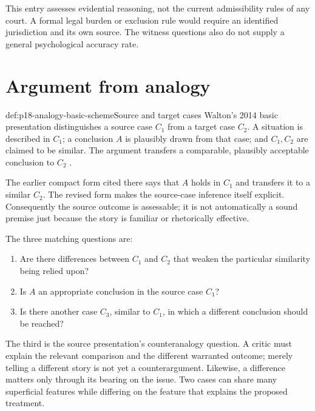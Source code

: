 This entry assesses evidential reasoning, not the current admissibility
rules of any court. A formal legal burden or exclusion rule would require
an identified jurisdiction and its own source. The witness questions
also do not supply a general psychological accuracy rate.

\section{Argument from analogy}
\label{sec:p18-scheme-analogy}

\begin{hbdefinition}{def:p18-analogy-basic-scheme}{Source and target cases}
Walton's 2014 basic presentation distinguishes a source case \(C_1\)
from a target case \(C_2\). A situation is described in \(C_1\);
a conclusion \(A\) is plausibly drawn from that case; and \(C_1,C_2\)
are claimed to be similar. The argument transfers a comparable,
plausibly acceptable conclusion to \(C_2\)
\cite[author version, pp.~1--3]{Walton2014AnalogySchemes}.

The earlier compact form cited there says that \(A\) holds in \(C_1\)
and transfers it to a similar \(C_2\). The revised form makes the
source-case inference itself explicit. Consequently the source outcome
is assessable; it is not automatically a sound premise just because
the story is familiar or rhetorically effective.
\end{hbdefinition}

The three matching questions are:

\begin{enumerate}
\item Are there differences between \(C_1\) and \(C_2\) that weaken
the particular similarity being relied upon?
\item Is \(A\) an appropriate conclusion in the source case \(C_1\)?
\item Is there another case \(C_3\), similar to \(C_1\), in which
a different conclusion should be reached?
\end{enumerate}

The third is the source presentation's counteranalogy question. A critic
must explain the relevant comparison and the different warranted outcome;
merely telling a different story is not yet a counterargument.
Likewise, a difference matters only through its bearing on the issue.
Two cases can share many superficial features while differing on the
feature that explains the proposed treatment.

